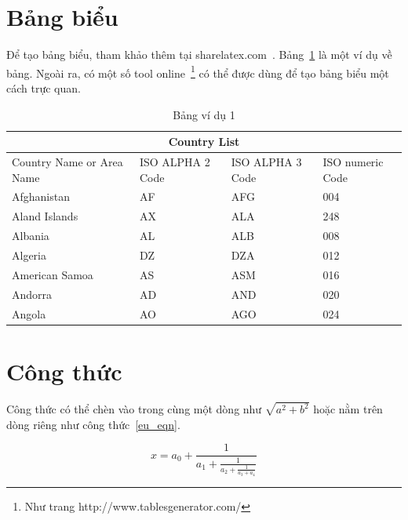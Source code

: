 \section{Bảng biểu}

Để tạo bảng biểu, tham khảo thêm tại sharelatex.com~\cite{Tables}.
Bảng~\ref{tab:vd1} là một ví dụ về bảng.
Ngoài ra, có một số tool online~\footnote{Như trang http://www.tablesgenerator.com/} có thể được dùng để tạo bảng biểu một cách trực quan.

\begin{table}[ht]
\caption{Bảng ví dụ 1}

\label{tab:vd1}%
\begin{center}
\begin{tabular}{ |p{3cm}||p{3cm}|p{3cm}|p{3cm}|  }
 \hline
 \multicolumn{4}{|c|}{Country List} \\
 \hline
 Country Name     or Area Name& ISO ALPHA 2 Code &ISO ALPHA 3 Code&ISO numeric Code\\
 \hline
 Afghanistan   & AF    &AFG&   004\\
 Aland Islands&   AX  & ALA   &248\\
 Albania &AL & ALB&  008\\
 Algeria    &DZ & DZA&  012\\
 American Samoa&   AS  & ASM&016\\
 Andorra& AD  & AND   &020\\
 Angola& AO  & AGO&024\\
 \hline
\end{tabular}
\end{center}
\end{table}

\section{Công thức}

Công thức có thể chèn vào trong cùng một dòng như $ \sqrt{a^2+b^2} $ hoặc nằm trên dòng riêng như công thức~\ref{eu_eqn}.

\begin{equation} \label{eu_eqn}
x = a_0 + \frac{1}{a_1 + \frac{1}{a_2 + \frac{1}{a_3 + a_4}}}
\end{equation}